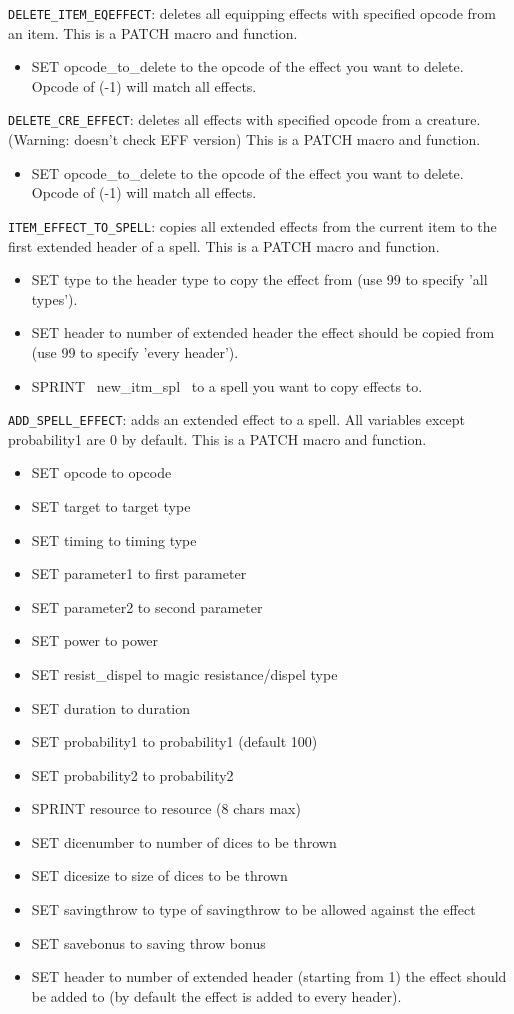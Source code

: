 \documentclass{article}
\begin{document}
\verb+DELETE_ITEM_EQEFFECT+: deletes all equipping effects with specified opcode from an item.
This is a PATCH macro and function.
\begin{itemize}
\item SET opcode_to_delete to the opcode of the effect you want to delete. Opcode of (-1) will match all effects.
\end{itemize}

\verb+DELETE_CRE_EFFECT+: deletes all effects with specified opcode from a creature. (Warning: doesn't check EFF version)
This is a PATCH macro and function.
\begin{itemize}
\item SET opcode_to_delete to the opcode of the effect you want to delete. Opcode of (-1) will match all effects.
\end{itemize}

\verb+ITEM_EFFECT_TO_SPELL+: copies all extended effects from the current item to the first extended header of a spell.
This is a PATCH macro and function.
\begin{itemize}
\item SET type to the header type to copy the effect from (use 99 to specify 'all types').
\item SET header to number of extended header the effect should be copied from (use 99 to specify 'every header').
\item SPRINT ~new_itm_spl~ to a spell you want to copy effects to.
\end{itemize}

\verb+ADD_SPELL_EFFECT+: adds an extended effect to a spell. All variables except probability1 are 0 by default.
This is a PATCH macro and function.
\begin{itemize}
\item SET opcode to opcode
\item SET target to target type
\item SET timing to timing type
\item SET parameter1 to first parameter
\item SET parameter2 to second parameter
\item SET power to power
\item SET resist_dispel to magic resistance/dispel type
\item SET duration to duration
\item SET probability1 to probability1 (default 100)
\item SET probability2 to probability2
\item SPRINT resource to resource (8 chars max)
\item SET dicenumber to number of dices to be thrown
\item SET dicesize to size of dices to be thrown
\item SET savingthrow to type of savingthrow to be allowed against the effect
\item SET savebonus to saving throw bonus
\item SET header to number of extended header (starting from 1) the effect should be added to (by default the effect is added to every header).
\end{itemize}
\end{document}
